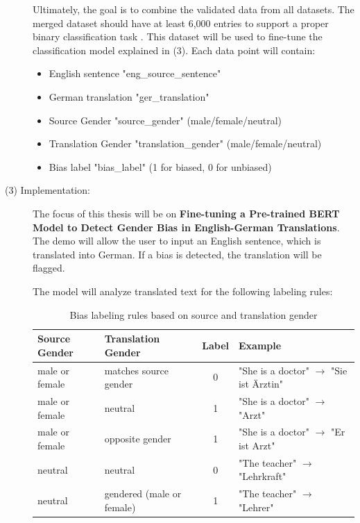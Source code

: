\begin{description}
Ultimately, the goal is to combine the validated data from all datasets. The merged dataset should have at least 6,000 entries to support a proper binary classification task \parencite{pecher_comparing_2024}. This dataset will be used to fine-tune the classification model explained in (3). Each data point will contain:

\begin{itemize}
    \item English sentence "eng\_source\_sentence"
    \item German translation "ger\_translation"
    \item Source Gender "source\_gender" (male/female/neutral)
    \item Translation Gender "translation\_gender" (male/female/neutral)
    \item Bias label "bias\_label" (1 for biased, 0 for unbiased)
\end{itemize}


\item[(3) Implementation:]

The focus of this thesis will be on \textbf{Fine-tuning a Pre-trained BERT Model to Detect Gender Bias in English-German Translations}. The demo will allow the user to input an English sentence, which is translated into German. If a bias is detected, the translation will be flagged. 

The model will analyze translated text for the following labeling rules:

\begin{table}[h]
\centering
\begin{tabular}{llc l}
\toprule
\textbf{Source Gender} & \textbf{Translation Gender} & \textbf{Label} & \textbf{Example} \\
\midrule
male or female & matches source gender & 0 & "She is a doctor" $\rightarrow$ "Sie ist Ärztin" \\
male or female & neutral & 1 & "She is a doctor" $\rightarrow$ "Arzt" \\
male or female & opposite gender & 1 & "She is a doctor" $\rightarrow$ "Er ist Arzt" \\
neutral & neutral & 0 & "The teacher" $\rightarrow$ "Lehrkraft" \\
neutral & gendered (male or female) & 1 & "The teacher" $\rightarrow$ "Lehrer" \\
\bottomrule
\end{tabular}
\caption{Bias labeling rules based on source and translation gender}
\label{tab:bias_labeling_rules}
\end{table}


\end{description}
